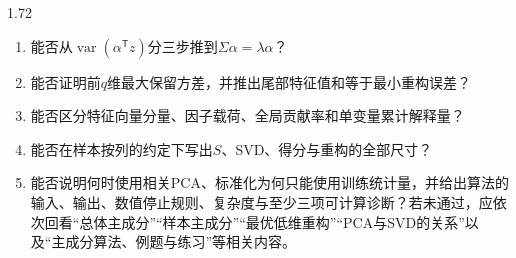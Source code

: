 \begin{SLCompactClosure}
\begin{spacing}{1.72}

\label{struct:V4-C04-CH36}

\label{struct:V4-C04-CH37}
\begin{selfcheckbox}
\begin{enumerate}[leftmargin=2.2em]
  \item 能否从$\operatorname{var}(\alpha^{\mathsf T}z)$分三步推到$\Sigma\alpha=\lambda\alpha$？
  \item 能否证明前$q$维最大保留方差，并推出尾部特征值和等于最小重构误差？
  \item 能否区分特征向量分量、因子载荷、全局贡献率和单变量累计解释量？
  \item 能否在样本按列的约定下写出$S$、SVD、得分与重构的全部尺寸？
  \item 能否说明何时使用相关PCA、标准化为何只能使用训练统计量，并给出算法的输入、输出、数值停止规则、复杂度与至少三项可计算诊断？若未通过，应依次回看“总体主成分”“样本主成分”“最优低维重构”“PCA与SVD的关系”以及“主成分算法、例题与练习”等相关内容。
\end{enumerate}
\end{selfcheckbox}
\end{spacing}
\end{SLCompactClosure}

